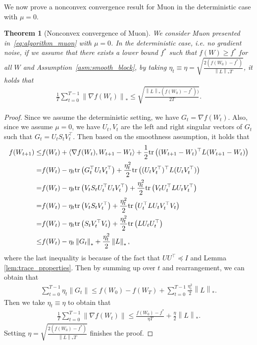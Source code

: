 \documentclass{article}
\newtheorem{theorem}{Theorem}
\theoremstyle{remark}
\newcommand{\Norm}[1]{\left\|#1\right\|}
\newcommand{\dotprod}[2]{\left\langle#1,#2\right\rangle}
\newcommand{\tr}[1]{{\rm tr}\left( #1 \right)}
\begin{document}
We now prove a nonconvex convergence result for Muon in the deterministic case with $\mu=0$.
\begin{theorem}[Nonconvex convergence of Muon]\label{thm:muon_nonconvex}
    We consider Muon presented in~\eqref{eq:algorithm_muon} with $\mu=0$. In the deterministic case, i.e. no gradient noise, if we assume that there exists a lower bound $f^*$ such that $f(W) \ge f^*$ for all $W$ and Assumption~\ref{asm:smooth_block}, by taking $\eta_t \equiv \eta = \sqrt{\frac{2(f(W_0) - f^*)}{ \Norm{L}_* T}}$, it holds that
    \begin{align*}
        \frac{1}{T} \sum_{t=0}^{T-1} \Norm{\nabla f(W_t)}_* \le \sqrt{\frac{\Norm{L}_* (f(W_0) - f^*))}{2T} } .
    \end{align*}
\end{theorem}
\begin{proof}
    Since we assume the deterministic setting, we have $G_t = \nabla f(W_t)$. Also, since we assume $\mu = 0$, we have $U_t,V_t$ are the left and right singular vectors of $G_t$ such that $G_t = U_t S_t V_t^\top$. Then based on the smoothness assumption, it holds that
    \begin{align*}
        f(W_{t+1}) \le& f(W_t) + \dotprod{\nabla f(W_t)}{W_{t+1} - W_t} + \frac{1}{2} \tr{(W_{t+1} - W_t)^\top L (W_{t+1} - W_t)} \\
        =& f(W_t) - \eta_t \tr{G_t^\top U_tV_t^\top} + \frac{\eta_t^2}{2} \tr{(U_tV_t^\top)^\top L (U_tV_t^\top)} \\
        =& f(W_t) - \eta_t \tr{V_t S_t U_t^\top U_tV_t^\top} + \frac{\eta_t^2}{2} \tr{V_t U_t^\top L U_tV_t^\top } \\
        =& f(W_t) - \eta_t \tr{V_t S_t V_t^\top} + \frac{\eta_t^2}{2} \tr{U_t^\top L U_tV_t^\top V_t } \\
        =& f(W_t) - \eta_t \tr{S_t V_t^\top V_t } + \frac{\eta_t^2}{2} \tr{ L U_t U_t^\top} \\
        \le& f(W_t) - \eta_t \Norm{G_t}_* + \frac{\eta_t^2}{2} \Norm{L}_* ,
    \end{align*}
    where the last inequality is because of the fact that $UU^\top \preceq I$ and Lemma \ref{lem:trace_properties}. Then by summing up over $t$ and rearrangement, we can obtain that
    \begin{align*}
        \sum_{t=0}^{T-1} \eta_t \Norm{G_t} \le f(W_0) - f(W_T) + \sum_{t=0}^{T-1} \frac{\eta_t^2}{2} \Norm{L}_* .
    \end{align*}
    Then we take $\eta_t \equiv \eta$ to obtain that
    \begin{align*}
        \frac{1}{T} \sum_{t=0}^{T-1} \Norm{\nabla f(W_t)} \le \frac{f(W_0) - f^*}{\eta T} + \frac{\eta}{2} \Norm{L}_*.
    \end{align*}
    Setting $\eta = \sqrt{\frac{2(f(W_0) - f^*)}{ \Norm{L}_* T}}$ finishes the proof.
\end{proof}
\end{document}
